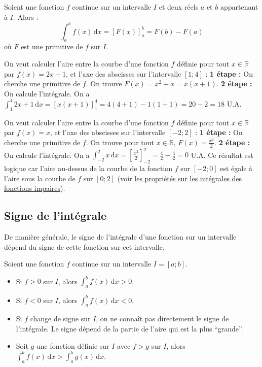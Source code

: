 	\begin{formula}
		Soient une fonction $f$ continue sur un intervalle $I$ et deux réels $a$ et $b$ appartenant à $I$. Alors :
		\[ \int_{a}^{b} f(x) \, \mathrm{d}x = \left[ F(x) \right]_a^b = F(b) - F(a) \]
		où $F$ est une primitive de $f$ sur $I$.
	\end{formula}

	\begin{tip}[Exemple]
		On veut calculer l'aire entre la courbe d'une fonction $f$ définie pour tout $x \in \mathbb{R}$ par $f(x) = 2x + 1$, et l'axe des abscisses sur l'intervalle $[1;4]$ :
		\newpar
		\textbf{1\iere{} étape :} On cherche une primitive de $f$. On trouve $F(x) = x^2 + x = x(x + 1)$.
		\newpar
		\textbf{2\ieme{} étape :} On calcule l'intégrale.
		On a $\int_{1}^{4} 2x + 1 \, \mathrm{d}x = \left[ x(x + 1) \right]_1^4 = 4(4 + 1) - 1(1 + 1) = 20 - 2 = 18$ U.A.
	\end{tip}

	\begin{tip}
		On veut calculer l'aire entre la courbe d'une fonction $f$ définie pour tout $x \in \mathbb{R}$ par $f(x) = x$, et l'axe des abscisses sur l'intervalle $[-2;2]$ :
		\newpar
		\textbf{1\iere{} étape :} On cherche une primitive de $f$. On trouve pour tout $x \in \mathbb{R}$, $F(x) = \frac{x^2}{2}$.
		\newpar
		\textbf{2\ieme{} étape :} On calcule l'intégrale. On a $\int_{-2}^{2} x \, \mathrm{d}x = \left[ \frac{x^2}{2} \right]_{-2}^2 = \frac{4}{2} - \frac{4}{2} = 0$ U.A.
		\newpar
		Ce résultat est logique car l'aire au-dessus de la courbe de la fonction $f$ sur $[-2;0]$ est égale à l'aire sous la courbe de $f$ sur $[0;2]$ (voir \hyperref[integrales-paires-impaires]{les propriétés sur les intégrales des fonctions impaires}).
	\end{tip}

	\subsection{Signe de l'intégrale}

	De manière générale, le signe de l'intégrale d'une fonction sur un intervalle dépend du signe de cette fonction sur cet intervalle.

	\begin{formula}
		Soient une fonction $f$ continue sur un intervalle $I = [a; b]$.
		\begin{itemize}
			\item Si $f > 0$ sur $I$, alors $\int_{a}^{b} f(x) \, \mathrm{d}x > 0$.
			\item Si $f < 0$ sur $I$, alors $\int_{a}^{b} f(x) \, \mathrm{d}x < 0$.
			\item Si $f$ change de signe sur $I$, on ne connaît pas directement le signe de l'intégrale. Le signe dépend de la partie de l'aire qui est la plus ``grande''.
			\item Soit $g$ une fonction définie sur $I$ avec $f > g$ sur $I$, alors $\int_{a}^{b} f(x) \, \mathrm{d}x > \int_{a}^{b} g(x) \, \mathrm{d}x$.
		\end{itemize}
	\end{formula}


